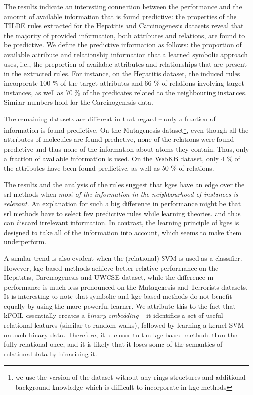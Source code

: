 The results indicate an interesting connection between the performance and the amount of available information that is found predictive: the properties of the TILDE rules extracted for the Hepatitis and Carcinogenesis datasets reveal that the majority of provided information, both attributes and relations, are found to be predictive.
We define the predictive information as follows: the proportion of available attribute and relationship information that a learned symbolic approach uses, i.e., the proportion of available attributes and relationships that are present in the extracted rules.
For instance, on the Hepatitis dataset,  the induced rules incorporate 100 \% of the target attributes and 66 \% of relations involving target instances, as well as 70 \% of the predicates related to the neighbouring instances.
Similar numbers hold for the Carcinogenesis data.



The remaining datasets are different in that regard -- only a fraction of information is found predictive.
On the Mutagenesis dataset\footnote{we use the version of the dataset without any rings structures and additional background knowledge which is difficult to incorporate in \gls{kge} methods}, even though all the attributes of molecules are found predictive, none of the relations were found predictive and thus none of the information about atoms they contain.
Thus, only a fraction of available information is used.
On the WebKB dataset, only 4 \% of the attributes have been found predictive, as well as 50 \% of relations.



The results and the analysis of the rules suggest that \gls{kge}s have an edge over the \gls{srl} methods when \textit{most of the information in the neighbourhood of instances is relevant}.
An explanation for such a big difference in performance might be that \gls{srl} methods have to select few predictive rules while learning theories, and thus can discard irrelevant information.
In contrast, the learning principle of \gls{kge}s is designed to take all of the information into account, which seems to make them underperform.




A similar trend is also evident when the (relational) SVM is used as a classifier.
However, \gls{kge}-based methods achieve better relative performance on the Hepatitis, Carcinogenesis and UWCSE dataset, while the difference in performance is much less pronounced on the Mutagenesis and Terrorists datasets.
It is interesting to note that symbolic and \gls{kge}-based methods do not benefit equally by using the more powerful learner.
We attribute this to the fact that kFOIL essentially creates a \textit{binary embedding} -- it identifies a set of useful relational features (similar to random walks), followed by learning a kernel SVM on such binary data.
Therefore,  it is closer to the \gls{kge}-based methods than the fully relational once, and it is likely that it loses some of the semantics of relational data by binarising it.



